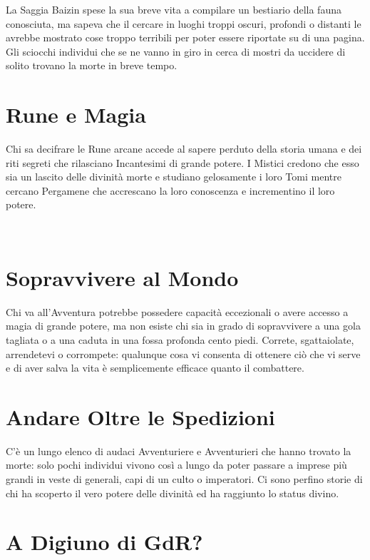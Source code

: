 \documentclass[itdr]{subfiles}
\begin{document}
La Saggia Baizin spese la sua breve vita a compilare un bestiario della fauna conosciuta, ma sapeva che il cercare in luoghi troppi oscuri, profondi o distanti le avrebbe mostrato cose troppo terribili per poter essere riportate su di una pagina. Gli sciocchi individui che se ne vanno in giro in cerca di mostri da uccidere di solito trovano la morte in breve tempo.

\section*{Rune e Magia}

Chi sa decifrare le Rune arcane accede al sapere perduto della storia umana e dei riti segreti che rilasciano Incantesimi di grande potere. I Mistici credono che esso sia un lascito delle divinità morte e studiano gelosamente i loro Tomi mentre cercano Pergamene che accrescano la loro conoscenza e incrementino il loro potere.

\vfill
\break

~\vspace{-17.5pt}
\section*{Sopravvivere al Mondo}

Chi va all’Avventura potrebbe possedere capacità eccezionali o avere accesso a magia di grande potere, ma non esiste chi sia in grado di sopravvivere a una gola tagliata o a una caduta in una fossa profonda cento piedi. Correte, sgattaiolate, arrendetevi o corrompete: qualunque cosa vi consenta di ottenere ciò che vi serve e di aver salva la vita è semplicemente efficace quanto il combattere.

\section*{Andare Oltre le Spedizioni}

C’è un lungo elenco di audaci Avventuriere e Avventurieri che hanno trovato la morte: solo pochi individui vivono così a lungo da poter passare a imprese più grandi in veste di generali, capi di un culto o imperatori. Ci sono perfino storie di chi ha scoperto il vero potere delle divinità ed ha raggiunto lo status divino.

\vspace{3.5pt}

\section*{A Digiuno di GdR?}
\end{document}
